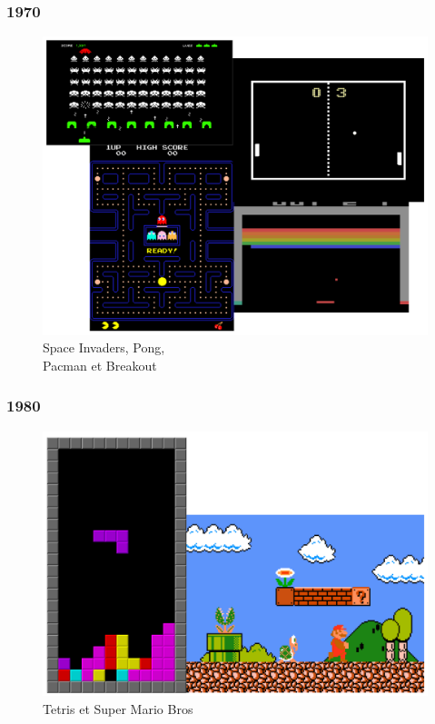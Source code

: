\begin{minipage}[t]{.48\textwidth}
	\subsubsection{1970}
	\begin{figure}[H]
		\captionsetup{format=myformat}
		\center
		\includegraphics[width=\linewidth]{./images/Introduction/imagdle1970.png}
		\caption{Space Invaders, Pong,\\ Pacman et Breakout}
	\end{figure}	
\end{minipage}\hspace{.04\textwidth}\begin{minipage}[t]{.48\textwidth}
	\subsubsection{1980}
	\begin{figure}[H]
		\center
		\includegraphics[width=\linewidth]{./images/Introduction/imagdle1980.png}
		\caption{Tetris et Super Mario Bros}
	\end{figure}
\end{minipage}


